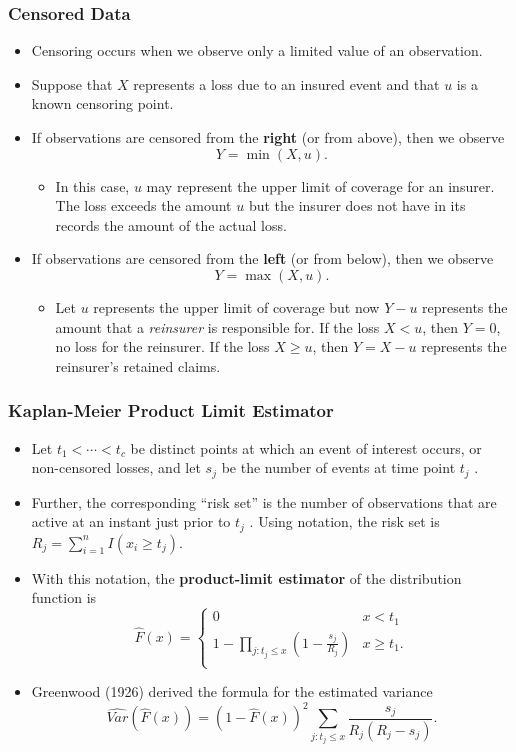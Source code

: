 \documentclass{beamer}
\begin{document}
\begin{frame}[shrink=.5]
\frametitle{Censored Data}
\begin{itemize}
\item Censoring occurs when we observe only a limited value of an observation.
\item Suppose that $X$ represents a loss due to an insured event and that $u$ is a known censoring point.
\item If observations are censored from the \textbf{right} (or from above), then we observe
$$ Y = \min(X,u).$$
\vspace{-.2in}
\begin{itemize}
\item In this case, $u$ may represent the upper limit of coverage for an insurer. The loss exceeds the amount $u$ but the insurer does not have in its records the amount of the actual loss.\end{itemize}
\item If observations are censored from the \textbf{left} (or from below), then we observe
$$ Y = \max(X,u).$$
\vspace{-.2in}
\begin{itemize}
\item Let $u$ represents the upper limit of coverage but now $Y - u$ represents the amount that a \textit{reinsurer} is responsible for. If the loss $X < u$, then $Y=0$, no loss for the reinsurer. If the loss $X  \ge u$, then $Y= X-u$ represents the reinsurer's retained claims.  \end{itemize}
\end{itemize}
\end{frame}

\begin{frame}[shrink=.22]
\frametitle{Kaplan-Meier Product Limit Estimator}
\begin{itemize}
\item  Let $t_{1} <\cdots< t_{c}$ be distinct points at which an event of interest occurs, or non-censored losses, and let $s_j$ be the number of events at time point $t_{j}$ .
\item  Further, the corresponding ``risk set'' is the number of observations that are active at an instant just prior to $t_{j}$ . Using notation, the risk set is $R_{j}=\sum_{i=1}^{n}I(x_{i}\geq t_{j})$.
\item  With this notation, the \textbf{product-limit estimator} of the distribution function is
$$
\hat{F}(x)=
\left\lbrace
\begin{array}{llll}
0 &
x < t_{1} \\
1-\prod_{j:t_{j} \leq x}\left( 1-\frac{s_j}{R_{j}}\right)  &
x \geq t_{1} .\\
\end{array}
\right .
$$
\item Greenwood (1926) derived the formula for the estimated variance
$$ \widehat{Var}(\hat{F}(x)) =
(1-\hat{F}(x))^{2}
\sum _{j:t_{j} \leq x} \dfrac{s_j}{R_{j}(R_{j}-s_j)}.$$
\end{itemize}
\end{frame}
\end{document}
